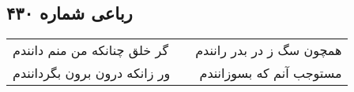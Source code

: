 \begin{center}
\section*{رباعی شماره ۴۳۰}
\label{sec:sh430}
\begin{longtable}{l p{0.5cm} r}
گر خلق چنانکه من منم دانندم
&&
همچون سگ ز در بدر رانندم
\\
ور زانکه درون برون بگردانندم
&&
مستوجب آنم که بسوزانندم
\\
\end{longtable}
\end{center}

